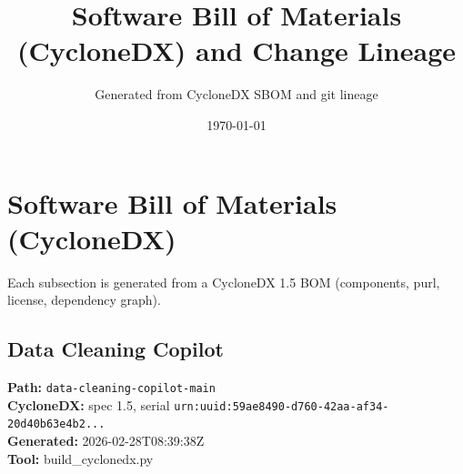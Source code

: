 \documentclass[11pt]{article}
\title{Software Bill of Materials (CycloneDX) and Change Lineage}
\author{Generated from CycloneDX SBOM and git lineage}
\date{\today}
\begin{document}
\maketitle
\tableofcontents
\newpage
\section{Software Bill of Materials (CycloneDX)}
Each subsection is generated from a CycloneDX 1.5 BOM (components, purl, license, dependency graph).

\subsection{Data Cleaning Copilot}
\textbf{Path:} \texttt{data-cleaning-copilot-main}
\\ \textbf{CycloneDX:} spec 1.5, serial \texttt{urn:uuid:59ae8490-d760-42aa-af34-20d40b63e4b2...}
\\ \textbf{Generated:} 2026-02-28T08:39:38Z
\\ \textbf{Tool:} build\_cyclonedx.py
\end{document}
